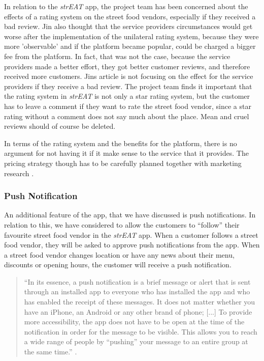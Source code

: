 In relation to the \textit{strEAT} app, the project team has been concerned about the effects of a rating system on the street food vendors, especially if they received a bad review. Jin also thought that the service providers circumstances would get worse after the implementation of the unilateral rating system, because they were more 'observable' and if the platform became popular, could be charged a bigger fee from the platform. In fact, that was not the case, because the service providers made a better effort, they got better customer reviews, and therefore received more customers. Jins article is not focusing on the effect for the service providers if they receive a bad review. The project team finds it important that the rating system in \textit{strEAT} is not only a star rating system, but the customer has to leave a comment if they want to rate the street food vendor, since a star rating without a comment does not say much about the place. Mean and cruel reviews should of course be deleted.

In terms of the rating system and the benefits for the platform, there is no argument for not having it if it make sense to the service that it provides. The pricing strategy though has to be carefully planned together with marketing research \cite{RatingsystemsImpact}.


\subsubsection{Push Notification}
An additional feature of the app, that we have discussed is push notifications. In relation to this, we have considered to allow the customers to “follow” their favourite street food vendor in the \textit{strEAT} app. When a customer follows a street food vendor, they will be asked to approve push notifications from the app. When a street food vendor changes location or have any news about their menu, discounts or opening hours, the customer will receive a push notification.

\begin{quotation}
“In its essence, a push notification is a brief message or alert that is sent through an installed app to everyone who has installed the app and who has enabled the receipt of these messages. It does not matter whether you have an iPhone, an Android or any other brand of phone; [...] To provide more accessibility, the app does not have to be open at the time of the notification in order for the message to be visible. This allows you to reach a wide range of people by “pushing” your message to an entire group at the same time.” \cite{WhatArePushnotifications}.
\end{quotation}

